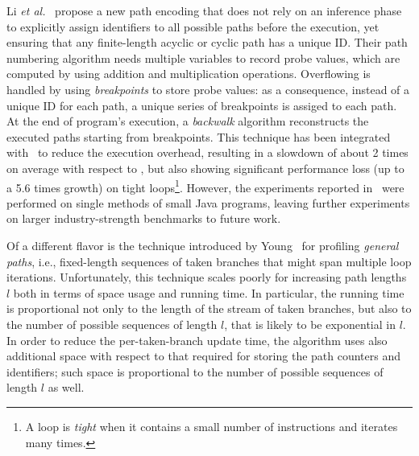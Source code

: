 Li {\em et al.}~\cite{Li12} propose a new path encoding that does not rely on an inference phase to explicitly assign identifiers to all possible paths before the execution, yet ensuring that any finite-length acyclic or cyclic path has a unique ID. Their path numbering algorithm needs multiple variables to record probe values, which are computed by using addition and multiplication operations. Overflowing is handled by using {\em breakpoints} to store probe values: as a consequence, instead of a unique ID for each path, a unique series of breakpoints is assiged to each path. At the end of program's execution, a {\em backwalk} algorithm reconstructs the executed paths starting from breakpoints. This technique has been integrated with \blpp\ to reduce the execution overhead, resulting in a slowdown of about 2 times on average with respect to \blpp, but also showing significant performance loss (up to a 5.6 times growth) on tight loops\footnote{A loop is {\em tight} when it contains a small number of instructions and iterates many times.}. However, the experiments reported in~\cite{Li12} were performed on single methods of small Java programs, leaving further experiments on larger industry-strength benchmarks to future work.


Of a different flavor is the technique introduced by Young~\cite{Young98} for profiling {\em general paths}, i.e., fixed-length sequences of taken branches that might span multiple loop iterations.
Unfortunately, this technique scales poorly for increasing path lengths $l$ both in terms of space usage and running time. In particular, the running time is proportional not only to the length of the stream of taken branches, but also to the number of possible sequences of length $l$, that is likely to be exponential in $l$. In order to reduce the per-taken-branch update time, the algorithm uses also additional space with respect to that required for storing the path counters and identifiers; such space is proportional to the number of possible sequences of length $l$ as well.
